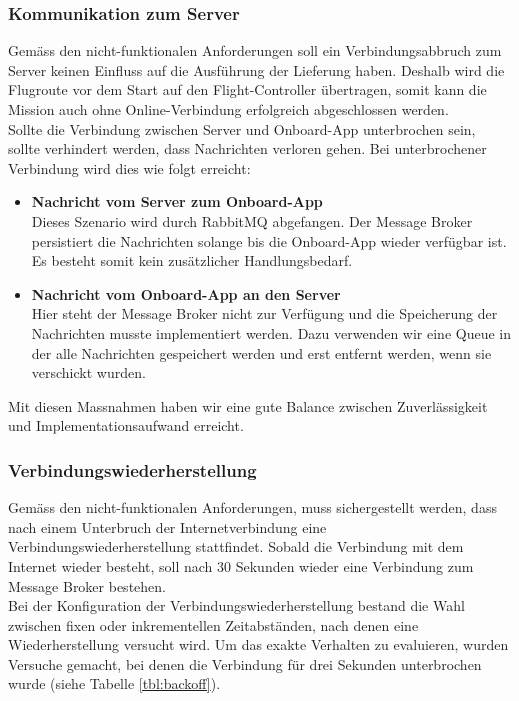 \subsubsection{Kommunikation zum Server}

Gemäss den nicht-funktionalen Anforderungen soll ein Verbindungsabbruch zum Server keinen Einfluss auf die Ausführung der Lieferung haben. Deshalb wird die Flugroute vor dem Start auf den \Gls{Flight-Controller} übertragen, somit kann die Mission auch ohne Online-Verbindung erfolgreich abgeschlossen werden. \\

Sollte die Verbindung zwischen Server und Onboard-App unterbrochen sein, sollte verhindert werden, dass Nachrichten verloren gehen. Bei unterbrochener Verbindung wird dies wie folgt erreicht:
\begin{itemize}
	\item{\textbf{Nachricht vom Server zum Onboard-App} \\
		Dieses Szenario wird durch RabbitMQ abgefangen. Der Message Broker persistiert die Nachrichten solange bis die Onboard-App wieder verfügbar ist. Es besteht somit kein zusätzlicher Handlungsbedarf.
	}
	\item{\textbf{Nachricht vom Onboard-App an den Server} \\
		Hier steht der Message Broker nicht zur Verfügung und die Speicherung der Nachrichten musste implementiert werden. Dazu verwenden wir eine Queue in der alle Nachrichten gespeichert werden und erst entfernt werden, wenn sie verschickt wurden.
	}
\end{itemize}
Mit diesen Massnahmen haben wir eine gute Balance zwischen Zuverlässigkeit und Implementationsaufwand erreicht.



\subsubsection{Verbindungswiederherstellung}
Gemäss den nicht-funktionalen Anforderungen, muss sichergestellt werden, dass nach einem Unterbruch der Internetverbindung eine Verbindungswiederherstellung stattfindet. Sobald die Verbindung mit dem Internet wieder besteht, soll nach 30 Sekunden wieder eine Verbindung zum Message Broker bestehen. \\

Bei der Konfiguration der Verbindungswiederherstellung bestand die Wahl zwischen fixen oder inkrementellen Zeitabständen, nach denen eine Wiederherstellung versucht wird. Um das exakte Verhalten zu evaluieren, wurden Versuche gemacht, bei denen die Verbindung für drei Sekunden unterbrochen wurde (siehe Tabelle \ref{tbl:backoff}).\\

